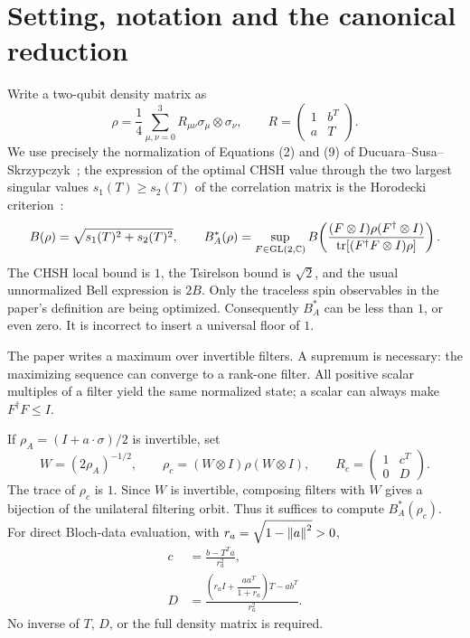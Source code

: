\section{Setting, notation and the canonical reduction}
\label{sec:setting}

Write a two-qubit density matrix as
\begin{equation}
 \rho=\frac14\sum_{\mu,\nu=0}^3 R_{\mu\nu}\sigma_\mu\otimes\sigma_\nu,
 \qquad R=\begin{pmatrix}1&b^T\\a&T\end{pmatrix}.
\end{equation}
We use precisely the normalization of Equations (2) and (9) of Ducuara--Susa--Skrzypczyk~\cite{ducuara}; the expression of the optimal CHSH value through the two largest singular values $s_1(T)\ge s_2(T)$ of the correlation matrix is the Horodecki criterion~\cite{horodecki1995}:
\begin{equation}
 B(\rho)=\sqrt{s_1(T)^2+s_2(T)^2},\qquad
 B_A^*(\rho)=\sup_{F\in\mathrm{GL}(2,\mathbb C)}
 B\!\left(\frac{(F\otimes I)\rho(F^\dagger\otimes I)}
 {\operatorname{tr}[(F^\dagger F\otimes I)\rho]}\right).
 \label{eq:definition}
\end{equation}
The CHSH local bound is $1$, the Tsirelson bound is $\sqrt2$, and the usual unnormalized Bell expression is $2B$. Only the traceless spin observables in the paper's definition are being optimized. Consequently $B_A^*$ can be less than $1$, or even zero. It is incorrect to insert a universal floor of $1$.

The paper writes a maximum over invertible filters. A supremum is necessary: the maximizing sequence can converge to a rank-one filter. All positive scalar multiples of a filter yield the same normalized state; a scalar can always make $F^\dagger F\le I$.

If $\rho_A=(I+a\cdot\sigma)/2$ is invertible, set
\begin{equation}
 W=(2\rho_A)^{-1/2},\qquad
 \rho_c=(W\otimes I)\rho(W\otimes I),\qquad
 R_c=\begin{pmatrix}1&c^T\\0&D\end{pmatrix}.
 \label{eq:canonical}
\end{equation}
The trace of $\rho_c$ is $1$. Since $W$ is invertible, composing filters with $W$ gives a bijection of the unilateral filtering orbit. Thus it suffices to compute $B_A^*(\rho_c)$. For direct Bloch-data evaluation, with $r_a=\sqrt{1-\left\lVert a\right\rVert^2}>0$,
\begin{align}
 c&=\frac{b-T^Ta}{r_a^2},\\
 D&=\frac{\left(r_a I+\dfrac{aa^T}{1+r_a}\right)T-ab^T}{r_a^2}.
 \label{eq:canonicalbloch}
\end{align}
No inverse of $T$, $D$, or the full density matrix is required.

